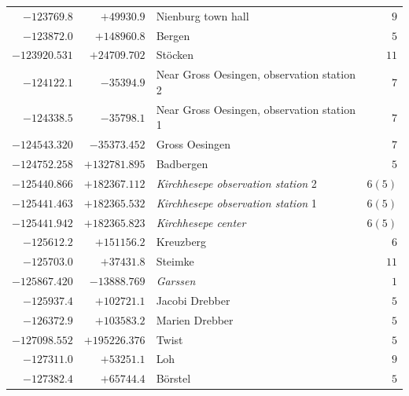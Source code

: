 \begin{center}
\begin{tabular}{r|r|p{170pt}|r}
\(-123769.8\)&\(+49930.9\)&Nienburg town hall&\(9\)\\
\(-123872.0\)&\(+148960.8\)&Bergen&\(5\)\\
\(-123920.531\)&\(+24709.702\)&Stöcken&\(11\)\\
\(-124122.1\)&\(-35394.9\)&Near Gross Oesingen, observation station 2&\(7\)\\
\(-124338.5\)&\(-35798.1\)&Near Gross Oesingen, observation station 1&\(7\)\\
\(-124543.320\)&\(-35373.452\)&Gross Oesingen&\(7\)\\
\(-124752.258\)&\(+132781.895\)&Badbergen&\(5\)\\
\(-125440.866\)&\(+182367.112\)&\textit{Kirchhesepe observation station} 2&\(6 (5)\)\\
\(-125441.463\)&\(+182365.532\)&\textit{Kirchhesepe observation station} 1&\(6 (5)\)\\
\(-125441.942\)&\(+182365.823\)&\textit{Kirchhesepe center}&\(6 (5)\)\\
\(-125612.2\)&\(+151156.2\)&Kreuzberg&\(6\)\\
\(-125703.0\)&\(+37431.8\)&Steimke&\(11\)\\
\(-125867.420\)&\(-13888.769\)&\textit{Garssen}&\(1\)\\
\(-125937.4\)&\(+102721.1\)&Jacobi Drebber&\(5\)\\
\(-126372.9\)&\(+103583.2\)&Marien Drebber&\(5\)\\
\(-127098.552\)&\(+195226.376\)&Twist&\(5\)\\
\(-127311.0\)&\(+53251.1\)&Loh&\(9\)\\
\(-127382.4\)&\(+65744.4\)&Börstel&\(5\)\\
\hline\end{tabular}\endgroup\end{center}
